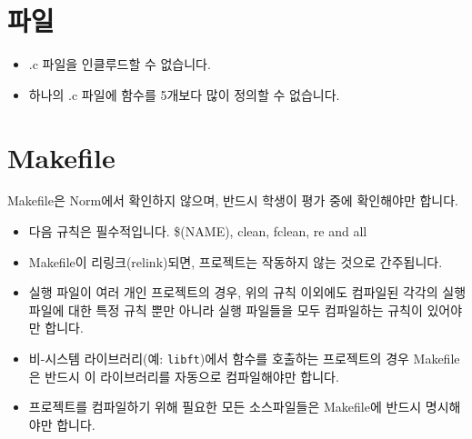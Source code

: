 \documentclass{42-ko}
\begin{document}
    \section{파일}

        \begin{itemize}

            \item .c 파일을 인클루드할 수 없습니다.

            \item 하나의 .c 파일에 함수를 5개보다 많이 정의할 수 없습니다.

        \end{itemize}
        \newpage


    \section{Makefile}

            Makefile은 Norm에서 확인하지 않으며, 반드시
              학생이 평가 중에 확인해야만 합니다.
            \begin{itemize}

                \item 다음 규칙은 필수적입니다.
                  \$(NAME), clean, fclean, re and all

                \item Makefile이 리링크(relink)되면, 프로젝트는
                  작동하지 않는 것으로 간주됩니다.

                \item 실행 파일이 여러 개인 프로젝트의 경우, 위의 규칙 이외에도
                  컴파일된 각각의 실행 파일에 대한 특정 규칙 뿐만 아니라
                  실행 파일들을 모두 컴파일하는 규칙이 있어야만 합니다.

                  \item 비-시스템 라이브러리(예: \texttt{libft})에서
                    함수를 호출하는 프로젝트의 경우 Makefile은
                    반드시 이 라이브러리를 자동으로 컴파일해야만 합니다.

                  \item 프로젝트를 컴파일하기 위해 필요한 모든 소스파일들은 
                    Makefile에 반드시 명시해야만 합니다.

            \end{itemize}
\end{document}
